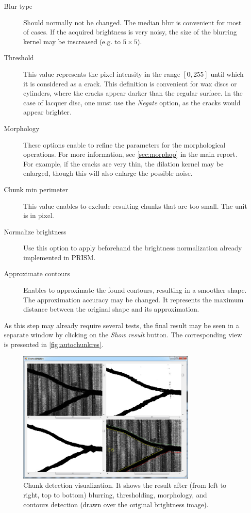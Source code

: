 \begin{description}
\item[Blur type] Should normally not be changed. The median blur is convenient for most of cases. If the acquired brightness is very noisy, the size of the blurring kernel may be inscreased (e.g. to $5 \times 5$).
\item[Threshold] This value represents the pixel intensity in the range $[0,255]$ until which it is considered as a crack. This definition is convenient for wax discs or cylinders, where the cracks appear darker than the regular surface. In the case of lacquer disc, one must use the \emph{Negate} option, as the cracks would appear brighter.
\item[Morphology] These options enable to refine the parameters for the morphological operations. For more information, see \autoref{sec:morphop} in the main report. For example, if the cracks are very thin, the dilation kernel may be enlarged, though this will also enlarge the possible noise.
\item[Chunk min perimeter] This value enables to exclude resulting chunks that are too small. The unit is in pixel.
\item[Normalize brightness] Use this option to apply beforehand the brightness normalization already implemented in PRISM. 
\item[Approximate contours] Enables to approximate the found contours, resulting in a smoother shape. The approximation accuracy may be changed. It represents the maximum distance between the original shape and its approximation.
\end{description}

As this step may already require several tests, the final result may be seen in a separate window by clicking on the \emph{Show result} button. The corresponding view is presented in \autoref{fig:autochunkres}.

\begin{figure}[!ht]
\centering
\includegraphics[width=0.8\textwidth]{images/auto-chunk-res}
\caption[Chunk detection visualization.]
{Chunk detection visualization. It shows the result after (from left to right, top to bottom) blurring, thresholding, morphology, and contours detection (drawn over the original brightness image).}
\label{fig:autochunkres}
\end{figure}

